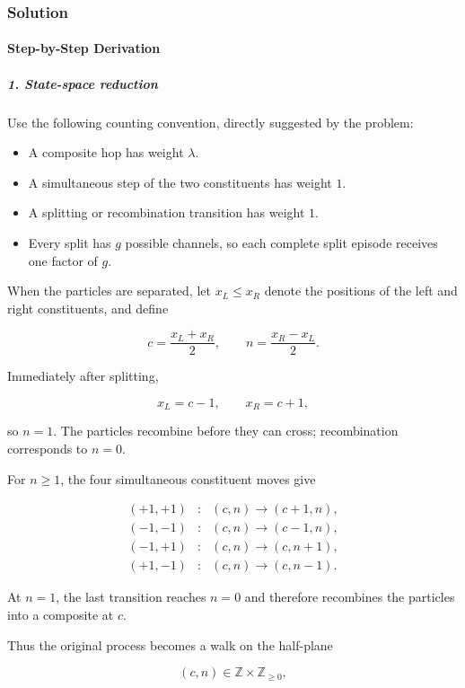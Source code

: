 \subsubsection*{Solution}
\paragraph*{Step-by-Step Derivation}

\subparagraph*{1. State-space reduction}

Use the following counting convention, directly suggested by the problem:

\begin{itemize}[leftmargin=*]
\item A composite hop has weight $\lambda$.
\item A simultaneous step of the two constituents has weight $1$.
\item A splitting or recombination transition has weight $1$.
\item Every split has $g$ possible channels, so each complete split episode receives one factor of $g$.
\end{itemize}

When the particles are separated, let $x_L\leq x_R$ denote the positions of the left and right constituents, and define

\[
c=\frac{x_L+x_R}{2}, \qquad n=\frac{x_R-x_L}{2}.
\]

Immediately after splitting,

\[
x_L=c-1,\qquad x_R=c+1,
\]

so $n=1$.
The particles recombine before they can cross; recombination corresponds to $n=0$.

For $n\geq 1$, the four simultaneous constituent moves give

\[
\begin{array}{ccl}
(+1,+1)&:&(c,n)\longrightarrow(c+1,n),\\
(-1,-1)&:&(c,n)\longrightarrow(c-1,n),\\
(-1,+1)&:&(c,n)\longrightarrow(c,n+1),\\
(+1,-1)&:&(c,n)\longrightarrow(c,n-1).
\end{array}
\]

At $n=1$, the last transition reaches $n=0$ and therefore recombines the particles into a composite at $c$.

Thus the original process becomes a walk on the half-plane

\[
(c,n)\in\mathbb Z\times\mathbb Z_{\geq0},
\]

